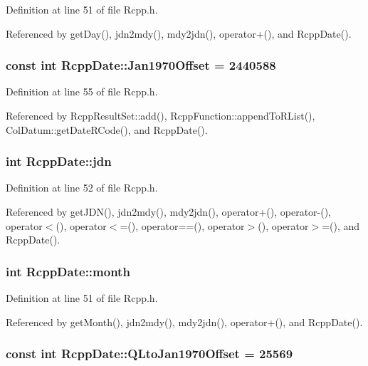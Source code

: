 Definition at line 51 of file Rcpp.h.

Referenced by getDay(), jdn2mdy(), mdy2jdn(), operator+(), and RcppDate().\hypertarget{classRcppDate_44b0643ab19489a0fb9700d25f504902}{
\subsubsection[{Jan1970Offset}]{\setlength{\rightskip}{0pt plus 5cm}const int {\bf RcppDate::Jan1970Offset} = 2440588}}
\label{classRcppDate_44b0643ab19489a0fb9700d25f504902}




Definition at line 55 of file Rcpp.h.

Referenced by RcppResultSet::add(), RcppFunction::appendToRList(), ColDatum::getDateRCode(), and RcppDate().\hypertarget{classRcppDate_b883f696379dd06e39c6c9b3502a2164}{
\subsubsection[{jdn}]{\setlength{\rightskip}{0pt plus 5cm}int {\bf RcppDate::jdn}}}
\label{classRcppDate_b883f696379dd06e39c6c9b3502a2164}




Definition at line 52 of file Rcpp.h.

Referenced by getJDN(), jdn2mdy(), mdy2jdn(), operator+(), operator-(), operator$<$(), operator$<$=(), operator==(), operator$>$(), operator$>$=(), and RcppDate().\hypertarget{classRcppDate_00bf3ece7320d63aee4f6b6df82b4f63}{
\subsubsection[{month}]{\setlength{\rightskip}{0pt plus 5cm}int {\bf RcppDate::month}}}
\label{classRcppDate_00bf3ece7320d63aee4f6b6df82b4f63}




Definition at line 51 of file Rcpp.h.

Referenced by getMonth(), jdn2mdy(), mdy2jdn(), operator+(), and RcppDate().\hypertarget{classRcppDate_06b285d4a04c5225a067e76d4fbfd2d4}{
\subsubsection[{QLtoJan1970Offset}]{\setlength{\rightskip}{0pt plus 5cm}const int {\bf RcppDate::QLtoJan1970Offset} = 25569}}
\label{classRcppDate_06b285d4a04c5225a067e76d4fbfd2d4}




